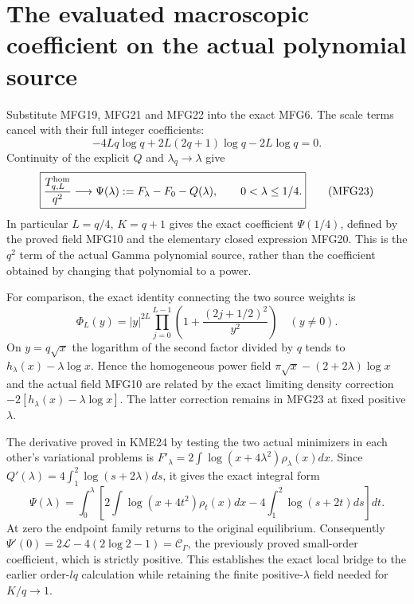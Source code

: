 \documentclass[11pt,a4paper]{article}
\begin{document}
\section{The evaluated macroscopic coefficient on the actual polynomial source}

Substitute MFG19, MFG21 and MFG22 into the exact MFG6. The scale
terms cancel with their full integer coefficients:
\[
 -4Lq\log q+2L(2q+1)\log q-2L\log q=0.
\]
Continuity of the explicit $Q$ and $\lambda_q\to\lambda$ give
\[
 \boxed{\frac{T_{q,L}^{\rm hom}}{q^2}\longrightarrow
 \Psi(\lambda):=F_\lambda-F_0-Q(\lambda),
 \qquad 0<\lambda\le1/4.}
 \tag{MFG23}
\]
In particular $L=q/4$, $K=q+1$ gives the exact coefficient
$\Psi(1/4)$, defined by the proved field MFG10 and the elementary
closed expression MFG20. This is the $q^2$ term of the actual Gamma
polynomial source, rather than the coefficient obtained by changing
that polynomial to a power.

For comparison, the exact identity connecting the two source weights is
\[
 \Phi_L(y)=|y|^{2L}
             \prod_{j=0}^{L-1}\left(1+\frac{(2j+1/2)^2}{y^2}\right)
 \quad(y\ne0).
 \tag{MFG24}
\]
On $y=q\sqrt x$ the logarithm of the second factor divided by $q$
tends to $h_\lambda(x)-\lambda\log x$. Hence the homogeneous power
field $\pi\sqrt x-(2+2\lambda)\log x$ and the actual field MFG10
are related by the exact limiting density correction
$-2[h_\lambda(x)-\lambda\log x]$. The latter correction remains
in MFG23 at fixed positive $\lambda$.

The derivative proved in KME24 by testing the two actual minimizers
in each other's variational problems is
$F'_\lambda=2\int\log(x+4\lambda^2)\rho_\lambda(x)dx$.
Since $Q'(\lambda)=4\int_1^2\log(s+2\lambda)ds$, it gives the exact
integral form
\[
 \Psi(\lambda)=\int_0^\lambda\left[
 2\int\log(x+4t^2)\rho_t(x)dx
                   -4\int_1^2\log(s+2t)ds\right]dt.
 \tag{MFG25}
\]
At zero the endpoint family returns to the original equilibrium.
Consequently $\Psi'(0)=2\mathcal L-4(2\log2-1)=\mathcal C_\Gamma$,
the previously proved small-order coefficient, which is strictly
positive. This establishes the exact local bridge to the earlier
order-$lq$ calculation while retaining the finite positive-$\lambda$
field needed for $K/q\to1$.
\end{document}
